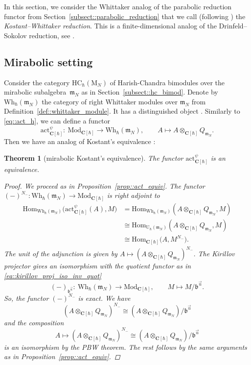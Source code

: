 \documentclass[pdftex]{sigma}
\numberwithin{equation}{section}
\newtheorem{Theorem}{Theorem}[section]
\newcommand{\C}{\mathbf{C}}
\newcommand{\U}{\mathrm{U}_{\hbar}}
\newcommand{\rM}{\mathrm{M}}
\renewcommand{\b}{\mathfrak{b}}
\newcommand{\n}{\mathfrak{n}}
\newcommand{\m}{\mathfrak{m}}
\newcommand{\Wh}{\mathrm{Wh}_{\hbar}}
\newcommand{\act}{\mathrm{act}}
\newcommand{\Mod}[1]{{\mathrm{Mod}}_{#1}}
\newcommand{\HC}{\mathrm{HC}_{\hbar}}
\newcommand{\Hom}{\mathrm{Hom}}
\begin{document}
	In this section, we consider the Whittaker analog of the parabolic reduction functor from Section~\ref{subsect::parabolic_reduction} that we call (following \cite{BezrukavnikovFinkelberg}) the \emph{Kostant--Whittaker reduction}. This is a finite-dimensional analog of the Drinfeld--Sokolov reduction, see \cite{Arakawa}.
	
	\subsection{Mirabolic setting} Consider the category $\HC(\rM_N)$ of Harish-Chandra bimodules over the mirabolic subalgebra~$\m_N$ as in Section~\ref{subsect::hc_bimod}. Denote by $\Wh(\m_N)$ the category of right Whittaker modules over $\m_N$ from Definition~\ref{def::whittaker_module}. It has a distinguished object \smash{$Q_{\m_N} = \n_-^{\psi} \backslash \U(\m_N)$}. Similarly to \eqref{eq::act_h}, we can define a functor
	\begin{equation*}
		\act_{\C[\hbar]}^{\psi} \colon\ \Mod{\C[\hbar]} \rightarrow \Wh(\m_N), \qquad A \mapsto A \otimes_{\C[\hbar]} Q_{\m_N}.
	\end{equation*}
	Then we have an analog of Kostant's equivalence \cite{Kostant}:
	\begin{Theorem}[mirabolic Kostant's equivalence]
		\label{thm::mirabolic_skryabin}
		The functor $\act_{\C[\hbar]}^{\psi}$ is an equivalence.
		\begin{proof}
			We proceed as in Proposition~\ref{prop::act_equiv}. The functor $(-)^{N_-} \colon \Wh(\m_N) \rightarrow \Mod{\C[\hbar]}$ is right adjoint to \smash{$\act_{\C[\hbar]}^{\psi}$}
			\begin{align*}
				\Hom_{\Wh(\m_N)} \bigl(\act_{\C[\hbar]}^{\psi}(A), M\bigr) &= \Hom_{\Wh(\m_N)}(A \otimes_{\C[\hbar]} Q_{\m_N},M) \\
				&\cong \Hom_{\U(\m_N)} (A \otimes_{\C[\hbar]} Q_{\m_N},M) \\
				&\cong \Hom_{\C[\hbar]}\bigl(A,M^{N_-}\bigr).
			\end{align*}
			The unit of the adjunction is given by
$
			A \mapsto (A \otimes_{\C[\hbar]} Q_{\m_N})^{N_-}$.
			The Kirillov projector gives an isomorphism with the quotient functor as in \eqref{eq::kirillov_proj_iso_inv_quot}
			\[
			(-)_{\b^{\vec{u}}}\colon\ \Wh(\m_N) \rightarrow \Mod{\C[\hbar]}, \qquad M \mapsto M/\b^{\vec{u}}.
			\]
			So, the functor $(-)^{N_-}$ is exact. We have
			\[
			(A \otimes_{\C[\hbar]} Q_{\m_N})^{N_-} \cong (A \otimes_{\C[\hbar]} Q_{\m_N})/ \b^{\vec{u}}
			\]
			and the composition
			\[
			A \mapsto (A \otimes_{\C[\hbar]} Q_{\m_N})^{N_-} \cong (A \otimes_{\C[\hbar]} Q_{\m_N})/ \b^{\vec{u}}
			\]
			is an isomorphism by the PBW theorem. The rest follows by the same arguments as in Proposition~\ref{prop::act_equiv}.
		\end{proof}
	\end{Theorem}
	
\end{document}
